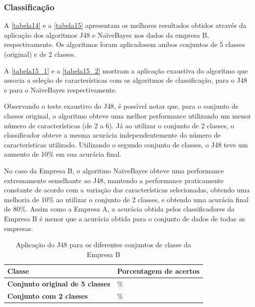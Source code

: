 \clearpage

\subsubsection{Classificação}

A \autoref{tabela14} e a \autoref{tabela15} apresentam os melhores resultados obtidos através da aplicação dos algoritmos J48 e NaïveBayes nos dados da empresa B, respectivamente. Os algoritmos foram aplicadosem ambos conjuntos de 5 classes (original) e de 2 classes. 

A \autoref{tabela15_1} e a \autoref{tabela15_2} mostram a aplicação exaustiva do algoritmo que associa a seleção de características com os algoritmos de classificação, para o J48 e para o NaïveBayes respectivamente.

Observando o teste exaustivo do J48, é possível notar que, para o conjunto de classes original, o algoritmo obteve uma melhor performance utilizando um menor número de características (de 2 a 6). Já ao utilizar o conjunto de 2 classes, o classificador obteve a mesma acurácia independentemente do número de características utilizado. Utilizando o segundo conjunto de classes, o J48 teve um aumento de 10\% em sua acurácia final.

No caso da Empresa B, o algoritmo NaïveBayes obteve uma performance extremamente semelhante ao J48, mantendo a performance praticamente constante de acordo com a variação das características selecionadas, obtendo uma melhoria de 10\% ao utilizar o conjunto de 2 classes, e obtendo uma acurácia final de 80\%. Assim como a Empresa A, a acurácia obtida pelos classificadores da Empresa B é menor que a acurácia obtida para o conjunto de dados de todas as empresas.

\begin{table}[h]
	\centering
	\caption{Aplicação do J48 para os diferentes conjuntos de classe da Empresa B}
	\label{tabela14}
	\def\arraystretch{1.5}
	\begin{tabular}{|p{7.25cm}|>{\centering\arraybackslash}p{7.25cm}|}
		\hline
		\textbf{Classe}                         & \textbf{Porcentagem de acertos} \\ \hline
		\textbf{Conjunto original de 5 classes} & 70\%                         \\ \hline
		\textbf{Conjunto com 2 classes}       & 80\%                         \\ \hline
	\end{tabular}
\end{table}


